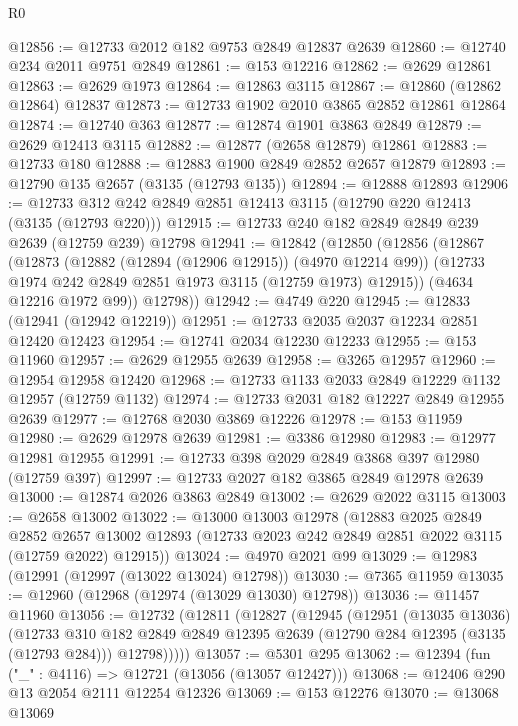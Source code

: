 \begin{lexlean}{R0}
\begin{coremodule}
@12856 := @12733 @2012 @182 @9753 @2849 @12837 @2639
@12860 := @12740 @234 @2011 @9751 @2849
@12861 := @153 @12216
@12862 := @2629 @12861
@12863 := @2629 @1973
@12864 := @12863 @3115
@12867 := @12860 (@12862 @12864) @12837
@12873 := @12733 @1902 @2010 @3865 @2852 @12861 @12864
@12874 := @12740 @363
@12877 := @12874 @1901 @3863 @2849
@12879 := @2629 @12413 @3115
@12882 := @12877 (@2658 @12879) @12861
@12883 := @12733 @180
@12888 := @12883 @1900 @2849 @2852 @2657 @12879
@12893 := @12790 @135 @2657 (@3135 (@12793 @135))
@12894 := @12888 @12893
@12906 := @12733 @312 @242 @2849 @2851 @12413 @3115 (@12790 @220 @12413 (@3135 (@12793 @220)))
@12915 := @12733 @240 @182 @2849 @2849 @239 @2639 (@12759 @239) @12798
@12941 := @12842
    (@12850
      (@12856
        (@12867
          (@12873
            (@12882 (@12894 (@12906 @12915)) (@4970 @12214 @99))
            (@12733 @1974 @242 @2849 @2851 @1973 @3115 (@12759 @1973) @12915))
          (@4634 @12216 @1972 @99))
        @12798))
@12942 := @4749 @220
@12945 := @12833 (@12941 (@12942 @12219))
@12951 := @12733 @2035 @2037 @12234 @2851 @12420 @12423
@12954 := @12741 @2034 @12230 @12233
@12955 := @153 @11960
@12957 := @2629 @12955 @2639
@12958 := @3265 @12957
@12960 := @12954 @12958 @12420
@12968 := @12733 @1133 @2033 @2849 @12229 @1132 @12957 (@12759 @1132)
@12974 := @12733 @2031 @182 @12227 @2849 @12955 @2639
@12977 := @12768 @2030 @3869 @12226
@12978 := @153 @11959
@12980 := @2629 @12978 @2639
@12981 := @3386 @12980
@12983 := @12977 @12981 @12955
@12991 := @12733 @398 @2029 @2849 @3868 @397 @12980 (@12759 @397)
@12997 := @12733 @2027 @182 @3865 @2849 @12978 @2639
@13000 := @12874 @2026 @3863 @2849
@13002 := @2629 @2022 @3115
@13003 := @2658 @13002
@13022 := @13000
    @13003
    @12978
    (@12883
      @2025
      @2849
      @2852
      @2657
      @13002
      @12893
      (@12733 @2023 @242 @2849 @2851 @2022 @3115 (@12759 @2022) @12915))
@13024 := @4970 @2021 @99
@13029 := @12983 (@12991 (@12997 (@13022 @13024) @12798))
@13030 := @7365 @11959
@13035 := @12960 (@12968 (@12974 (@13029 @13030) @12798))
@13036 := @11457 @11960
@13056 := @12732
    (@12811
      (@12827
        (@12945
          (@12951
            (@13035 @13036)
            (@12733
              @310
              @182
              @2849
              @2849
              @12395
              @2639
              (@12790 @284 @12395 (@3135 (@12793 @284)))
              @12798)))))
@13057 := @5301 @295
@13062 := @12394 (fun ("_" : @4116) => @12721 (@13056 (@13057 @12427)))
@13068 := @12406 @290 @13 @2054 @2111 @12254 @12326
@13069 := @153 @12276
@13070 := @13068 @13069

\end{coremodule}
\end{lexlean}
